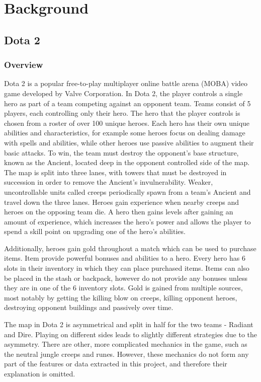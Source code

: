 \documentclass[Report.tex]{subfiles}
\begin{document}
\section{Background}

\subsection{Dota 2}
\subsubsection{Overview}
Dota 2 is a popular free-to-play multiplayer online battle arena (MOBA) video game developed by Valve Corporation. In Dota 2, the player controls a single hero as part of a team competing against an opponent team. Teams consist of 5 players, each controlling only their hero. The hero that the player controls is chosen from a roster of over 100 unique heroes. Each hero has their own unique abilities and characteristics, for example some heroes focus on dealing damage with spells and abilities, while other heroes use passive abilities to augment their basic attacks. To win, the team must destroy the opponent's base structure, known as the Ancient, located deep in the opponent controlled side of the map. The map is split into three lanes, with towers that must be destroyed in succession in order to remove the Ancient's invulnerability. Weaker, uncontrollable units called creeps periodically spawn from a team's Ancient and travel down the three lanes. Heroes gain experience when nearby creeps and heroes on the opposing team die. A hero then gains levels after gaining an amount of experience, which increases the hero's power and allows the player to spend a skill point on upgrading one of the hero's abilities. 

Additionally, heroes gain gold throughout a match which can be used to purchase items. Item provide powerful bonuses and abilities to a hero. Every hero has 6 slots in their inventory in which they can place purchased items. Items can also be placed in the stash or backpack, however do not provide any bonuses unless they are in one of the 6 inventory slots. Gold is gained from multiple sources, most notably by getting the killing blow on creeps, killing opponent heroes, destroying opponent buildings and passively over time. 


The map in Dota 2 is asymmetrical and split in half for the two teams - Radiant and Dire. Playing on different sides leads to slightly different strategies due to the asymmetry. There are other, more complicated mechanics in the game, such as the neutral jungle creeps and runes. However, these mechanics do not form any part of the features or data extracted in this project, and therefore their explanation is omitted. 
\end{document}
